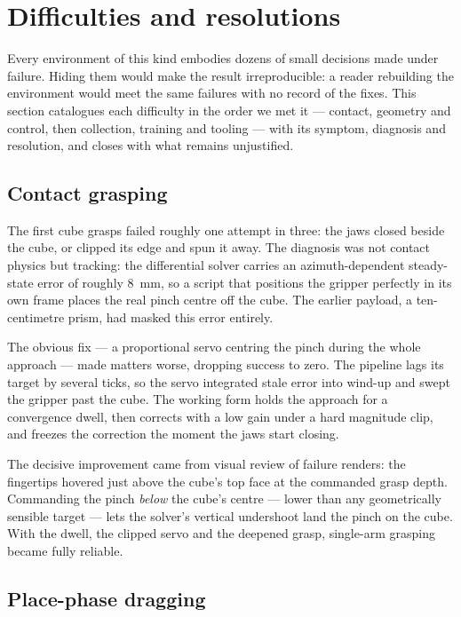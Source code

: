 \section{Difficulties and resolutions}
\label{sec:difficulties}

Every environment of this kind embodies dozens of small decisions made
under failure. Hiding them would make the result irreproducible: a
reader rebuilding the environment would meet the same failures with no
record of the fixes. This section catalogues each difficulty in the
order we met it --- contact, geometry and control, then collection,
training and tooling --- with its symptom, diagnosis and resolution, and
closes with what remains unjustified.

\subsection{Contact grasping}
\label{sec:diff-grasp}

The first cube grasps failed roughly one attempt in three: the jaws
closed beside the cube, or clipped its edge and spun it away. The
diagnosis was not contact physics but tracking: the differential solver
carries an azimuth-dependent steady-state error of roughly
\SI{8}{\milli\metre}, so a script that positions the gripper perfectly
in its own frame places the real pinch centre off the cube. The earlier
payload, a ten-centimetre prism, had masked this error entirely.

The obvious fix --- a proportional servo centring the pinch during the
whole approach --- made matters worse, dropping success to zero. The
pipeline lags its target by several ticks, so the servo integrated stale
error into wind-up and swept the gripper past the cube. The working
form holds the approach for a convergence dwell, then corrects with a
low gain under a hard magnitude clip, and freezes the correction the
moment the jaws start closing.

The decisive improvement came from visual review of failure renders:
the fingertips hovered just above the cube's top face at the commanded
grasp depth. Commanding the pinch \emph{below} the cube's centre ---
lower than any geometrically sensible target --- lets the solver's
vertical undershoot land the pinch on the cube. With the dwell, the
clipped servo and the deepened grasp, single-arm grasping became
fully reliable.

\subsection{Place-phase dragging}
\label{sec:diff-drag}

